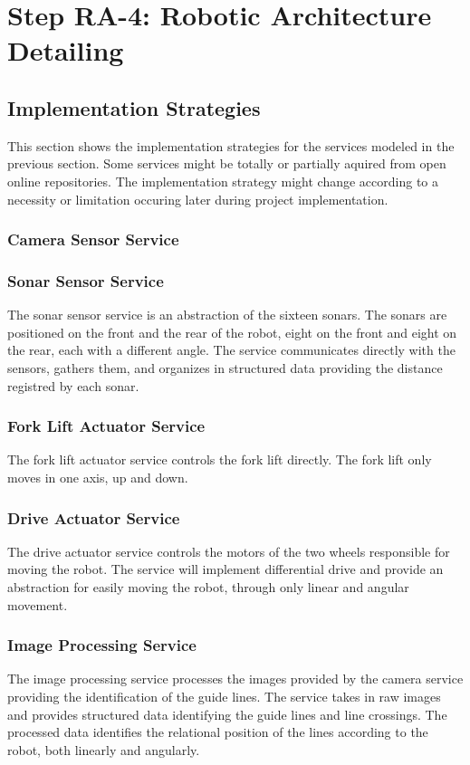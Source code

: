 \section{Step RA-4: Robotic Architecture Detailing}
\subsection{Implementation Strategies}
This section shows the implementation strategies for the services modeled in the previous section. Some services might be totally or partially aquired from open online repositories. The implementation strategy might change according to a necessity or limitation occuring later during project implementation.

\subsubsection*{Camera Sensor Service}
\subsubsection*{Sonar Sensor Service}
The sonar sensor service is an abstraction of the sixteen sonars. The sonars are positioned on the front and the rear of the robot, eight on the front and eight on the rear, each with a different angle. The service communicates directly with the sensors, gathers them, and organizes in structured data providing the distance registred by each sonar.
\subsubsection*{Fork Lift Actuator Service}
The fork lift actuator service controls the fork lift directly. The fork lift only moves in one axis, up and down.
\subsubsection*{Drive Actuator Service}
The drive actuator service controls the motors of the two wheels responsible for moving the robot. The service will implement differential drive and provide an abstraction for easily moving the robot, through only linear and angular movement.

\subsubsection*{Image Processing Service}
The image processing service processes the images provided by the camera service providing the identification of the guide lines. The service takes in raw images and provides structured data identifying the guide lines and line crossings. The processed data identifies the relational position of the lines according to the robot, both linearly and angularly.

